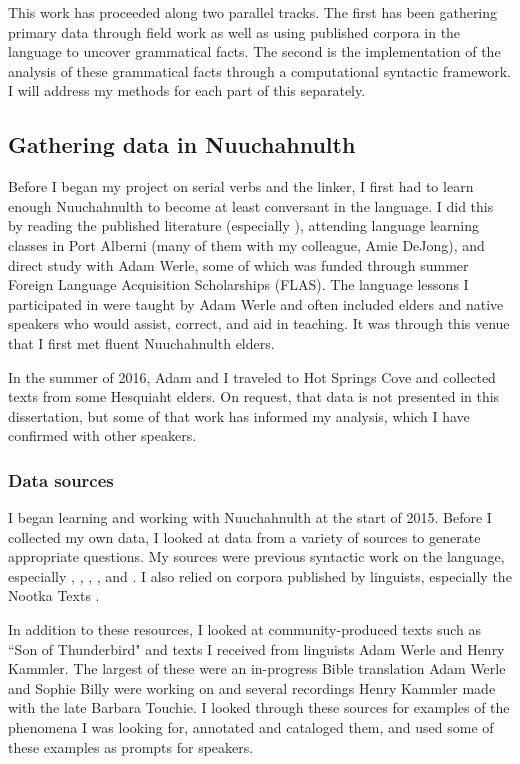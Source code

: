 This work has proceeded along two parallel tracks. The first has been gathering primary data through field work as well as using published corpora in the language to uncover grammatical facts. The second is the implementation of the analysis of these grammatical facts through a computational syntactic framework. I will address my methods for each part of this separately.

\subsection{Gathering data in Nuuchahnulth} \label{sec:method:ncn}

Before I began my project on serial verbs and the linker, I first had to learn enough Nuuchahnulth to become at least conversant in the language. I did this by reading the published literature (especially \citealt{sapir1939}), attending language learning classes in Port Alberni (many of them with my colleague, Amie DeJong), and direct study with Adam Werle, some of which was funded through summer Foreign Language Acquisition Scholarships (FLAS). The language lessons I participated in were taught by Adam Werle and often included elders and native speakers who would assist, correct, and aid in teaching. It was through this venue that I first met fluent Nuuchahnulth elders.

In the summer of 2016, Adam and I traveled to Hot Springs Cove and collected texts from some Hesquiaht elders. On request, that data is not presented in this dissertation, but some of that work has informed my analysis, which I have confirmed with other speakers.

\subsubsection{Data sources} \label{sec:method:sources}

I began learning and working with Nuuchahnulth at the start of 2015. Before I collected my own data, I looked at data from a variety of sources to generate appropriate questions. My sources were previous syntactic work on the language, especially \cite{jacobsen1993}, \cite{nakayama2001}, \cite{wojdak2003}, \cite{waldie2004}, and \cite{woo2007b}. I also relied on corpora published by linguists, especially the Nootka Texts \citep{sapir1924, sapir1939, sapir1955, whalingindians2000, whalingindians2004, whalingindians2009}.

In addition to these resources, I looked at community-produced texts such as ``Son of Thunderbird" and texts I received from linguists Adam Werle and Henry Kammler. The largest of these were an in-progress Bible translation Adam Werle and Sophie Billy were working on and several recordings Henry Kammler made with the late Barbara Touchie. I looked through these sources for examples of the phenomena I was looking for, annotated and cataloged them, and used some of these examples as prompts for speakers.

